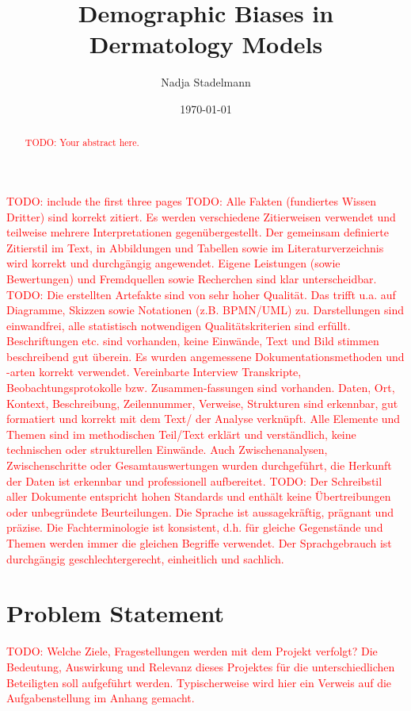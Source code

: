 \documentclass[a4paper,12pt,listof=numbered,toc=chapterentrywithdots]{scrreport}
\title{Demographic Biases in Dermatology Models}
\author{Nadja Stadelmann}
\date{\today}
\renewcommand{\todo}[1]{\textcolor{red}{TODO: #1}}
\begin{document}
	
	\maketitle
	
	\begin{abstract}
		\todo{Your abstract here.}
	\end{abstract}
	
	\tableofcontents
	\listoftodos
	
	\todo{include the first three pages}
	\todo{Alle Fakten (fundiertes Wissen Dritter) sind korrekt zitiert. Es werden verschiedene Zitierweisen verwendet und teilweise mehrere Interpretationen gegenübergestellt. Der gemeinsam definierte Zitierstil im Text, in Abbildungen und Tabellen sowie im Literaturverzeichnis wird korrekt und durchgängig angewendet. Eigene Leistungen (sowie Bewertungen) und Fremdquellen sowie Recherchen sind klar unterscheidbar.} \linebreak
	\todo{Die erstellten Artefakte sind von sehr hoher Qualität. Das trifft u.a. auf Diagramme, Skizzen sowie Notationen (z.B. BPMN/UML) zu. Darstellungen sind einwandfrei, alle statistisch notwendigen Qualitätskriterien sind erfüllt. Beschriftungen etc. sind vorhanden, keine Einwände, Text und Bild stimmen beschreibend gut überein. Es wurden angemessene Dokumentationsmethoden und -arten korrekt verwendet. Vereinbarte Interview Transkripte, Beobachtungsprotokolle bzw. Zusammen-fassungen sind vorhanden. Daten, Ort, Kontext, Beschreibung, Zeilennummer, Verweise, Strukturen sind erkennbar, gut formatiert und korrekt mit dem Text/ der Analyse verknüpft. Alle Elemente und Themen sind im methodischen Teil/Text erklärt und verständlich, keine technischen oder strukturellen Einwände. Auch Zwischenanalysen, Zwischenschritte oder Gesamtauswertungen wurden durchgeführt, die Herkunft der Daten ist erkennbar und professionell aufbereitet.} \linebreak
	\todo{Der Schreibstil aller Dokumente entspricht hohen Standards und enthält keine Übertreibungen oder unbegründete Beurteilungen. Die Sprache ist aussagekräftig, prägnant und präzise. Die Fachterminologie ist konsistent, d.h. für gleiche Gegenstände und Themen werden immer die gleichen Begriffe verwendet. Der Sprachgebrauch ist durchgängig geschlechtergerecht, einheitlich und sachlich.}
	
	
	\chapter{Problem Statement}
		\todo{Welche Ziele, Fragestellungen werden mit dem Projekt verfolgt? Die Bedeutung, Auswirkung und Relevanz	dieses Projektes für die unterschiedlichen Beteiligten soll aufgeführt werden. Typischerweise wird hier ein Verweis auf die Aufgabenstellung im Anhang gemacht.}
	
\end{document}
